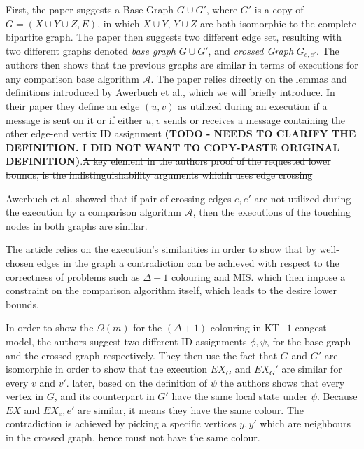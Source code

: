 \documentclass[11pt]{article}
\begin{document}
First, the paper suggests a Base Graph $G \cup G'$, where $G'$ is a copy of $G = ( X \cup Y \cup Z, E)$, in which $X \cup Y$, $Y \cup Z$ are both isomorphic to the complete bipartite graph. The paper then suggests two different edge set, resulting with two different graphs denoted \textit{base graph} $G \cup G'$, and \textit{crossed Graph} $G_{e,e'}$.
The authors then shows that the previous graphs are similar in terms of executions for any comparison base algorithm $\mathcal{A}$. The paper relies directly on the lemmas and definitions introduced by Awerbuch et al.\cite{Awerbuch}, which we will briefly introduce. In their paper they define an edge $(u,v)$ as utilized during an execution if a message is sent on it or if either $u, v$ sends or receives a message containing the other edge-end vertix ID assignment \textbf{(TODO - NEEDS TO CLARIFY THE DEFINITION. I DID NOT WANT TO COPY-PASTE ORIGINAL DEFINITION)}.\sout{A key element in the authors proof of the requested lower bounds, is the indistinguishability arguments whichh uses edge crossing}

Awerbuch et al. showed that if pair of crossing edges $e, e'$ are not utilized during the execution by a comparison algorithm $\mathcal{A}$, then the executions of the touching nodes in both graphs are similar.

The article relies on the execution's similarities in order to show that by well-chosen edges in the graph a contradiction can be achieved with respect to the correctness of problems such as $\Delta +1 $ colouring and MIS. which then impose a constraint on the comparison algorithm itself, which leads to the desire lower bounds.

In order to show the $\Omega(m)$ for the $(\Delta +1)$-colouring in KT$-1$ congest model, the authors suggest two different ID assignments $\phi, \psi$, for the base graph and the crossed graph respectively. They then use the fact that $G$ and $G'$ are isomorphic in order to show that the execution $EX_G$ and $EX_G'$ are similar for every $v$ and $v'$. later, based on the definition of $\psi$ the authors shows that every vertex in $G$, and its counterpart in $G'$ have the same local state under $\psi$. Because $EX$ and $EX_e,e'$ are similar, it means they have the same colour. The contradiction is achieved by picking a specific vertices $y,y'$ which are neighbours in the crossed graph, hence must not have the same colour.
\end{document}
